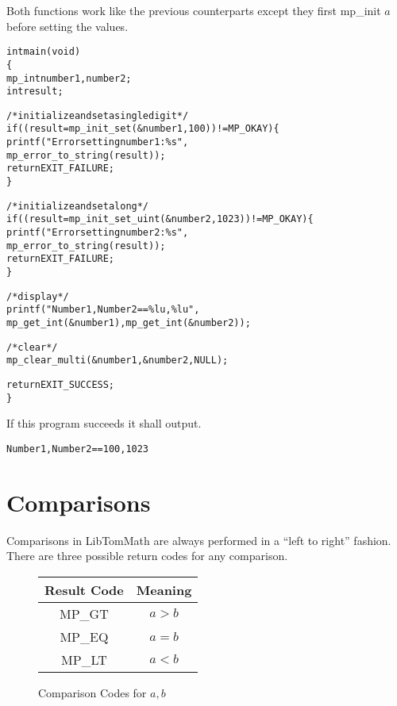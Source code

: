 \documentclass[synpaper]{book}
\begin{document}
Both functions work like the previous counterparts except they first mp\_init $a$ before setting the values.

\begin{alltt}
int main(void)
\{
   mp_int number1, number2;
   int    result;

   /* initialize and set a single digit */
   if ((result = mp_init_set(&number1, 100)) != MP_OKAY) \{
      printf("Error setting number1: \%s",
             mp_error_to_string(result));
      return EXIT_FAILURE;
   \}

   /* initialize and set a long */
   if ((result = mp_init_set_uint(&number2, 1023)) != MP_OKAY) \{
      printf("Error setting number2: \%s",
             mp_error_to_string(result));
      return EXIT_FAILURE;
   \}

   /* display */
   printf("Number1, Number2 == \%lu, \%lu",
          mp_get_int(&number1), mp_get_int(&number2));

   /* clear */
   mp_clear_multi(&number1, &number2, NULL);

   return EXIT_SUCCESS;
\}
\end{alltt}

If this program succeeds it shall output.
\begin{alltt}
Number1, Number2 == 100, 1023
\end{alltt}

\section{Comparisons}

Comparisons in LibTomMath are always performed in a ``left to right'' fashion.  There are three possible return codes
for any comparison.

  
\begin{figure}[h]
\begin{center}
\begin{tabular}{|c|c|}
\hline \textbf{Result Code} & \textbf{Meaning} \\
\hline MP\_GT & $a > b$ \\
\hline MP\_EQ & $a = b$ \\
\hline MP\_LT & $a < b$ \\
\hline
\end{tabular}
\end{center}
\caption{Comparison Codes for $a, b$}
\label{fig:CMP}
\end{figure}
\end{document}
